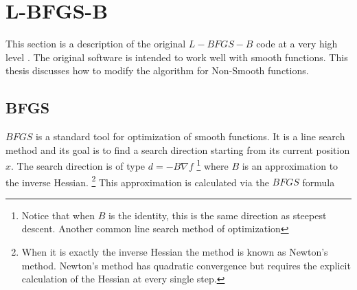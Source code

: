 



\chapter{L-BFGS-B}
\label{ChapterConstraints} %

This section is a description of the original $L-BFGS-B$ code at a very high level \citep{lbfgsbsoftware}. The original software is intended to work well with smooth functions. This thesis discusses how to modify the algorithm for Non-Smooth functions.

\section{BFGS}

$BFGS$ is a standard tool for optimization of smooth functions. It is a line search method and its goal is to find a search direction starting from its current position $x$. The search direction is of type $d = -B \nabla f$ \footnote{Notice that when $B$ is the identity, this is the same direction as steepest descent. Another common line search method of optimization} where $B$ is an approximation to the inverse Hessian. \footnote{When it is exactly the inverse Hessian the method is known as Newton's method. Newton's method has quadratic convergence but requires the explicit calculation of the Hessian at every single step.} This approximation is calculated via the $BFGS$ formula




